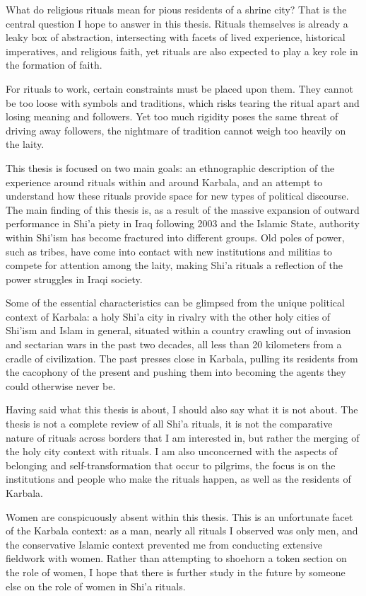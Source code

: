 What do religious rituals mean for pious residents of a shrine city? That is the central question I hope to answer in this thesis. Rituals themselves is already a leaky box of abstraction, intersecting with facets of lived experience, historical imperatives, and religious faith, yet rituals are also expected to play a key role in the formation of faith. 

For rituals to work, certain constraints must be placed upon them. They cannot be too loose with symbols and traditions, which risks tearing the ritual apart and losing meaning and followers. Yet too much rigidity poses the same threat of driving away followers, the nightmare of tradition cannot weigh too heavily on the laity. 

This thesis is focused on two main goals: an ethnographic description of the experience around rituals within and around Karbala, and an attempt to understand how these rituals provide space for new types of political discourse. The main finding of this thesis is, as a result of the massive expansion of outward performance in Shi'a piety in Iraq following 2003 and the Islamic State, authority within Shi'ism has become fractured into different groups. Old poles of power, such as tribes, have come into contact with new institutions and militias to compete for attention among the laity, making Shi'a rituals a reflection of the power struggles in Iraqi society. 

Some of the essential characteristics can be glimpsed from the unique political context of Karbala: a holy Shi'a city in rivalry with the other holy cities of Shi'ism and Islam in general, situated within a country crawling out of invasion and sectarian wars in the past two decades, all less than 20 kilometers from a cradle of civilization. The past presses close in Karbala, pulling its residents from the cacophony of the present and pushing them into becoming the agents they could otherwise never be. 

Having said what this thesis is about, I should also say what it is not about. The thesis is not a complete review of all Shi'a rituals, it is not the comparative nature of rituals across borders that I am interested in, but rather the merging of the holy city context with rituals. I am also unconcerned with the aspects of belonging and self-transformation that occur to pilgrims, the focus is on the institutions and people who make the rituals happen, as well as the residents of Karbala. 

Women are conspicuously absent within this thesis. This is an unfortunate facet of the Karbala context: as a man, nearly all rituals I observed was only men, and the conservative Islamic context prevented me from conducting extensive fieldwork with women. Rather than attempting to shoehorn a token section on the role of women, I hope that there is further study in the future by someone else on the role of women in Shi'a rituals. 

